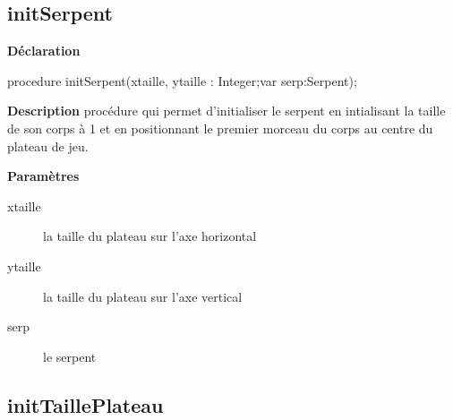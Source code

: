\documentclass{report}
\newif\ifpdf
\begin{document}
\subsection*{initSerpent}
\fi
\label{Initialisation-initSerpent}
\begin{list}{}{
\setlength{\itemindent}{0cm}
\setlength{\listparindent}{0cm}
\setlength{\leftmargin}{\evensidemargin}
\addtolength{\leftmargin}{\tmplength}
\settowidth{\labelsep}{X}
\addtolength{\leftmargin}{\labelsep}
\setlength{\labelwidth}{\tmplength}
}
\item[\textbf{Déclaration}\hfill]
\ifpdf
\begin{flushleft}
\fi
\begin{ttfamily}
procedure initSerpent(xtaille, ytaille : Integer;var serp:Serpent);\end{ttfamily}

\ifpdf
\end{flushleft}
\fi

\par
\item[\textbf{Description}]
procédure qui permet d'initialiser le serpent en intialisant la taille de son corps à 1 et en positionnant le premier morceau du corps au centre du plateau de jeu.   \par
\item[\textbf{Paramètres}]
\begin{description}
\item[xtaille] la taille du plateau sur l'axe horizontal
\item[ytaille] la taille du plateau sur l'axe vertical
\item[serp] le serpent
\end{description}


\end{list}
\ifpdf
\subsection*{\large{\textbf{initTaillePlateau}}\normalsize\hspace{1ex}\hrulefill}
\else
\end{document}
